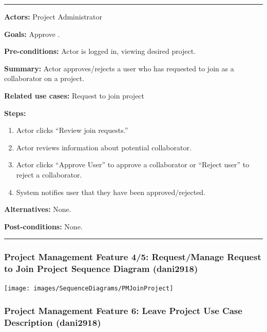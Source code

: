 \documentclass[twoside,letterpaper]{article}
\begin{document}
\vspace{2pt}
\hrule
\vspace{8pt}
\noindent \textbf{Actors:} Project Administrator \newline
 
\noindent \textbf{Goals:} Approve . \newline

\noindent \textbf{Pre-conditions:} Actor is logged in, viewing desired project.  \newline

\noindent \textbf{Summary:} Actor approves/rejects a user who has requested to join as a collaborator on a project.\newline

\noindent \textbf{Related use cases:} Request to join project \newline

\noindent \textbf{Steps:} \begin{enumerate}
  \item Actor clicks ``Review join requests.''
  \item Actor reviews information about potential collaborator.
  \item Actor clicks ``Approve User'' to approve a collaborator or ``Reject user'' to reject a collaborator.
  \item System notifies user that they have been approved/rejected.
 \end{enumerate}
 \textbf{Alternatives:} None. \newline
 
 \noindent  \textbf{Post-conditions:} None. \newline
 \noindent
\vspace{8pt}
\hrule

\vspace{20pt}
\subsubsection[Project Management Feature 4/5: Request/Manage Request to Join Project Sequence Diagram  (dani2918)]{\rmfamily\bfseries\color{black}
	Project Management Feature 4/5: Request/Manage Request to Join Project Sequence Diagram (dani2918)}

\texttt{[image: images/SequenceDiagrams/PMJoinProject]}


\newpage




\subsubsection[Project Management Feature 6: Leave Project Use Case Description (dani2918)]{\rmfamily\bfseries\color{black}
	Project Management Feature 6: Leave Project Use Case Description  (dani2918)}
\hypertarget{RefHeading22059017292}{}
\bigskip
\end{document}
